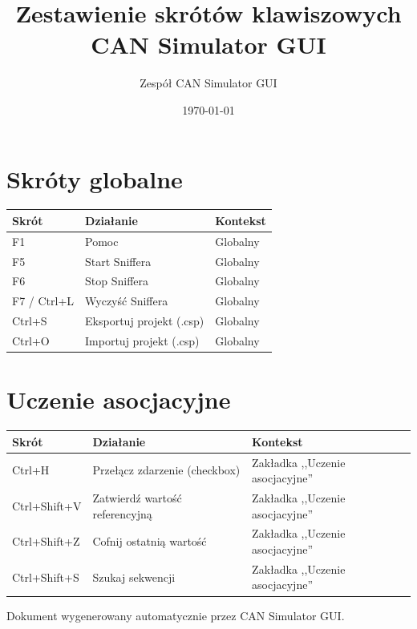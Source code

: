 \documentclass[a4paper,12pt]{article}
\title{Zestawienie skrótów klawiszowych\\CAN Simulator GUI}
\author{Zespół CAN Simulator GUI}
\date{\today}
\begin{document}
\maketitle
\section*{Skróty globalne}
\begin{center}
\begin{tabularx}{0.8\textwidth}{|l|X|l|}
\hline
\rowcolor{gray!30}
\textbf{Skrót} & \textbf{Działanie} & \textbf{Kontekst} \\
\hline
F1 & Pomoc & Globalny \\
F5 & Start Sniffera & Globalny \\
F6 & Stop Sniffera & Globalny \\
F7 / Ctrl+L & Wyczyść Sniffera & Globalny \\
Ctrl+S & Eksportuj projekt (.csp) & Globalny \\
Ctrl+O & Importuj projekt (.csp) & Globalny \\
\hline
\end{tabularx}
\end{center}

\section*{Uczenie asocjacyjne}
\begin{center}
\begin{tabularx}{0.8\textwidth}{|l|X|l|}
\hline
\rowcolor{gray!30}
\textbf{Skrót} & \textbf{Działanie} & \textbf{Kontekst} \\
\hline
Ctrl+H & Przełącz zdarzenie (checkbox) & Zakładka ,,Uczenie asocjacyjne'' \\
Ctrl+Shift+V & Zatwierdź wartość referencyjną & Zakładka ,,Uczenie asocjacyjne'' \\
Ctrl+Shift+Z & Cofnij ostatnią wartość & Zakładka ,,Uczenie asocjacyjne'' \\
Ctrl+Shift+S & Szukaj sekwencji & Zakładka ,,Uczenie asocjacyjne'' \\
\hline
\end{tabularx}
\end{center}

\vfill
\noindent\small Dokument wygenerowany automatycznie przez CAN Simulator GUI.
\end{document}

